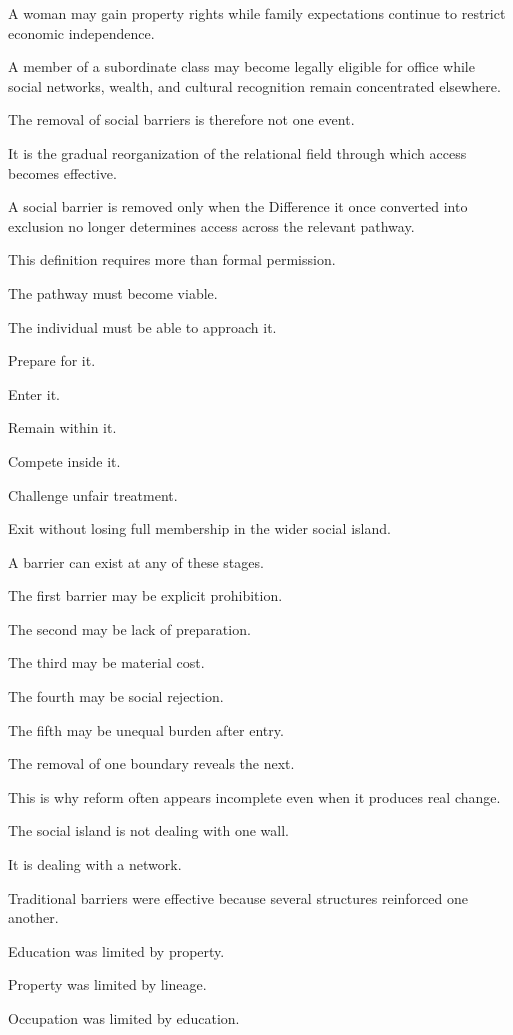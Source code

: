 A woman may gain property rights while family expectations continue to restrict economic independence.

A member of a subordinate class may become legally eligible for office while social networks, wealth, and cultural recognition remain concentrated elsewhere.

The removal of social barriers is therefore not one event.

It is the gradual reorganization of the relational field through which access becomes effective.

A social barrier is removed only when the Difference it once converted into exclusion no longer determines access across the relevant pathway.

This definition requires more than formal permission.

The pathway must become viable.

The individual must be able to approach it.

Prepare for it.

Enter it.

Remain within it.

Compete inside it.

Challenge unfair treatment.

Exit without losing full membership in the wider social island.

A barrier can exist at any of these stages.

The first barrier may be explicit prohibition.

The second may be lack of preparation.

The third may be material cost.

The fourth may be social rejection.

The fifth may be unequal burden after entry.

The removal of one boundary reveals the next.

This is why reform often appears incomplete even when it produces real change.

The social island is not dealing with one wall.

It is dealing with a network.

Traditional barriers were effective because several structures reinforced one another.

Education was limited by property.

Property was limited by lineage.

Occupation was limited by education.

